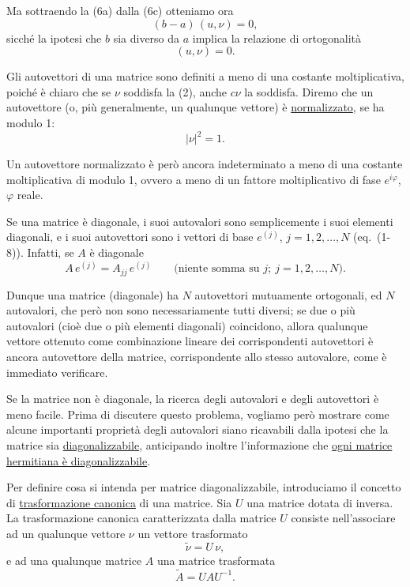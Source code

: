 \documentclass[11pt, a4paper]{book}
\numberwithin{equation}{section}
\begin{document}
Ma sottraendo la (6a) dalla (6c) otteniamo ora
\begin{equation}
(b - a)\,(u, \nu) = 0,
\end{equation}
sicché la ipotesi che $b$ sia diverso da $a$ implica la relazione di
ortogonalità
\begin{equation}
(u, \nu) = 0.
\end{equation}

Gli autovettori di una matrice sono definiti a meno di una costante
moltiplicativa, poiché è chiaro che se $\nu$ soddisfa la (2), anche $c\nu$
la soddisfa. Diremo che un autovettore (o, più generalmente, un qualunque
vettore) è \uline{normalizzato}, se ha modulo 1:
\begin{equation}
|\nu|^2 = 1.
\end{equation}



Un autovettore normalizzato è però ancora indeterminato a meno di una
costante moltiplicativa di modulo 1, ovvero a meno di un fattore
moltiplicativo di fase $e^{i\varphi}$, $\varphi$ reale.

Se una matrice è diagonale, i suoi autovalori sono semplicemente i suoi
elementi diagonali, e i suoi autovettori sono i vettori di base
$e^{(j)}$, $j = 1, 2, \ldots, N$ (eq.\ (1-8)). Infatti, se $A$ è
diagonale
\begin{equation}
A\, e^{(j)} = A_{jj}\, e^{(j)}
\qquad \text{(niente somma su } j;\ j = 1,2,\ldots,N\text{)}.
\end{equation}

Dunque una matrice (diagonale) ha $N$ autovettori mutuamente ortogonali,
ed $N$ autovalori, che però non sono necessariamente tutti diversi; se due
o più autovalori (cioè due o più elementi diagonali) coincidono, allora
qualunque vettore ottenuto come combinazione lineare dei corrispondenti
autovettori è ancora autovettore della matrice, corrispondente allo stesso
autovalore, come è immediato verificare.

Se la matrice non è diagonale, la ricerca degli autovalori e degli
autovettori è meno facile. Prima di discutere questo problema, vogliamo
però mostrare come alcune importanti proprietà degli autovalori siano
ricavabili dalla ipotesi che la matrice sia \uline{diagonalizzabile},
anticipando inoltre l'informazione che \uline{ogni matrice hermitiana è
diagonalizzabile}.

Per definire cosa si intenda per matrice diagonalizzabile, introduciamo il
concetto di \uline{trasformazione canonica} di una matrice. Sia $U$
una matrice dotata di inversa. La trasformazione canonica caratterizzata
dalla matrice $U$ consiste nell'associare ad un qualunque vettore $\nu$ un
vettore trasformato
\begin{equation}
\widetilde{\nu} = U\,\nu,
\end{equation}
e ad una qualunque matrice $A$ una matrice trasformata
\begin{equation}
\widetilde{A} = U A U^{-1}.
\end{equation}
\end{document}
